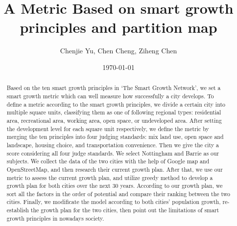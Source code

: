 \documentclass[a4paper,11pt]{article}
\title{A Metric Based on smart growth principles and partition map}
\author{\small Chenjie Yu, Chen Cheng, Ziheng Chen }
\date{\today}
\begin{document}
\begin{abstract}
Based on the ten smart growth principles in `The Smart Growth Network', we set a smart growth metric which can well measure how successfully a city develops.
To define a metric according to the smart growth principles, we divide a certain city into multiple square units, classifying them as one of following regional types: residential area, recreational area, working area, open space, or undeveloped area. After setting the development level for each square unit respectively, we define the metric by merging the ten principles into four judging standards: mix land use, open space and landscape, housing choice, and transportation convenience. Then we give the city a score considering all four judge standards.
We select Nottingham and Barrie as our subjects. We collect the data of the two cities with the help of Google map and OpenStreetMap, and then research their current growth plan. After that, we use our metric to assess the current growth plan, and utilize greedy method to develop a growth plan for both cities over the next 30 years. According to our growth plan, we sort all the factors in the order of potential and compare their ranking between the two cities.
Finally, we modificate the model according to both cities' population growth, re-establish the growth plan for the two cities, then point out the limitations of smart growth principles in nowadays society.
\end{abstract}

\maketitle
\thispagestyle{empty}
\pagestyle{empty}
\newpage

\tableofcontents
\newpage
\pagestyle{fancy}
\setcounter{page}{1}


\end{document}
